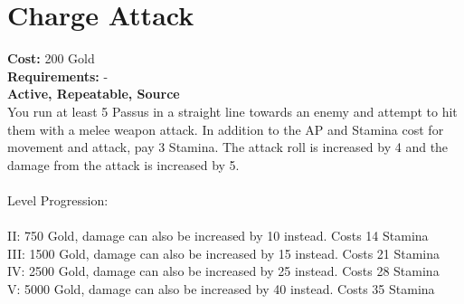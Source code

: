 \section{Charge Attack}
\textbf{Cost:} 200 Gold\\
\textbf{Requirements:} -\\
\textbf{Active, Repeatable, Source}\\
You run at least 5 Passus in a straight line towards an enemy and attempt to hit them with a melee weapon attack. In addition to the AP and Stamina cost for movement and attack, pay 3 Stamina. The attack roll is increased by 4 and the damage from the attack is increased by 5.\\
\\
Level Progression:\\
\\
II: 750 Gold, damage can also be increased by 10 instead. Costs 14 Stamina\\
III: 1500 Gold, damage can also be increased by 15 instead. Costs 21 Stamina\\
IV: 2500 Gold, damage can also be increased by 25 instead. Costs 28 Stamina\\
V: 5000 Gold, damage can also be increased by 40 instead. Costs 35 Stamina\\